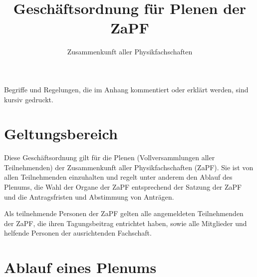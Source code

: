 \documentclass[
  a4paper,
  oneside]{scrartcl}
\title{Geschäftsordnung für Plenen der ZaPF}
\author{Zusammenkunft aller Physikfachschaften}
\date{}
\begin{document}
\maketitle

Begriffe und Regelungen, die im Anhang kommentiert oder erklärt werden,
sind kursiv gedruckt.

\hypertarget{geltungsbereich}{%
\section{Geltungsbereich}\label{geltungsbereich}}

Diese Geschäftsordnung gilt für die Plenen (Vollversammlungen aller
Teilnehmenden) der Zusammenkunft aller Physikfachschaften (ZaPF). Sie
ist von allen Teilnehmenden einzuhalten und regelt unter anderem den
Ablauf des Plenums, die Wahl der Organe der ZaPF entsprechend der
Satzung der ZaPF und die Antragsfristen und Abstimmung von Anträgen.

Als teilnehmende Personen der ZaPF gelten alle angemeldeten
Teilnehmenden der ZaPF, die ihren Tagungsbeitrag entrichtet haben, sowie
alle Mitglieder und helfende Personen der ausrichtenden Fachschaft.

\hypertarget{ablauf-eines-plenums}{%
\section{Ablauf eines Plenums}\label{ablauf-eines-plenums}}
\end{document}
